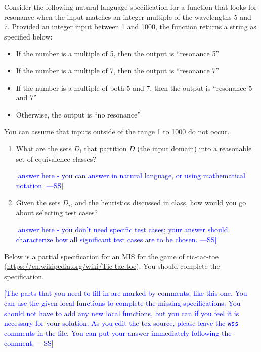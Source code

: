 \documentclass[12pt,fleqn]{examtst}
\newcommand{\authornote}[3]{\textcolor{#1}{[#3 ---#2]}}
\newcommand{\authornote}[3]{}
\newcommand{\wss}[1]{\authornote{blue}{SS}{#1}}
\begin{document}

\newpage

 Consider the following natural language specification for a
function that looks for resonance when the input matches an integer multiple of
the wavelengths 5 and 7. Provided an integer input between 1 and 1000, the
function returns a string as specified below:

\begin{itemize}
\item If the number is a multiple of 5, then the output is “resonance 5”
\item If the number is a multiple of 7, then the output is “resonance 7”
\item If the number is a multiple of both 5 and 7, then the output is “resonance
  5 and 7”
\item Otherwise, the output is “no resonance”
\end{itemize}

You can assume that inputs outside of the range 1 to 1000 do not occur.

\begin{enumerate}
\item What are the sets $D_i$ that partition $D$ (the input domain) into a
  reasonable set of equivalence classes?

  \wss{answer here - you can answer in natural language, or using mathematical
    notation.}

\item Given the sets $D_i$, and the heuristics discussed in class, how would you
  go about selecting test cases?

  \wss{answer here - you don't need specific test cases; your answer should
    characterize how all significant test cases are to be chosen.}
  
\end{enumerate}
  

\newpage

 Below is a partial specification for an MIS for the game of
tic-tac-toe (\url{https://en.wikipedia.org/wiki/Tic-tac-toe}).  You should
complete the specification.

\bigskip

\wss{The parts that you need to fill in are marked by comments, like this one.
  You can use the given local functions to complete the missing specifications.
  You should not have to add any new local functions, but you can if you feel it
  is necessary for your solution.  As you edit the tex source, please leave the
  \texttt{wss} comments in the file.  You can put your answer immediately
  following the comment.}
\end{document}

